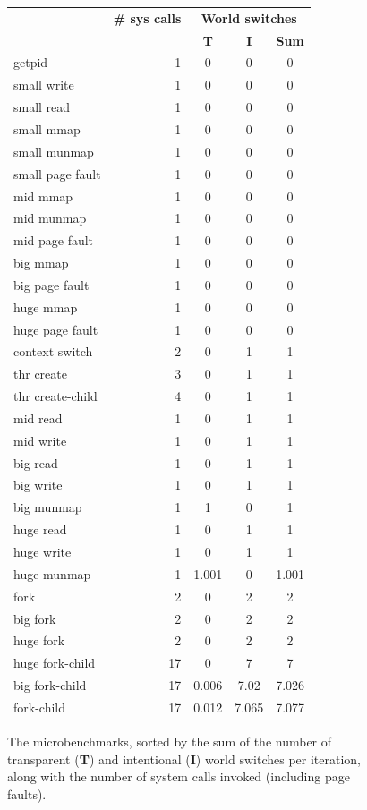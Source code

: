 \begin{figure}
\small
\centering
\begin{tabular}{lrccc}
  & {\bf \# sys calls} & \multicolumn{3}{c}{{\bf World switches}} \\
  & & {\bf T} & {\bf I} & {\bf Sum}  \\
  \midrule
getpid & 1 & 0 & 0 & 0 \\
small write & 1 & 0 & 0 & 0 \\
small read & 1 & 0 & 0 & 0 \\
small mmap & 1 & 0 & 0 & 0 \\
small munmap & 1 & 0 & 0 & 0 \\
small page fault & 1 & 0 & 0 & 0 \\
mid mmap & 1 & 0 & 0 & 0 \\
mid munmap & 1 & 0 & 0 & 0 \\
mid page fault & 1 & 0 & 0 & 0 \\
big mmap & 1 & 0 & 0 & 0 \\
big page fault & 1 & 0 & 0 & 0 \\
huge mmap & 1 & 0 & 0 & 0 \\
huge page fault & 1 & 0 & 0 & 0 \\
context switch & 2 & 0 & 1 & 1 \\
thr create & 3 & 0 & 1 & 1 \\
thr create-child & 4 & 0 & 1 & 1 \\
mid read & 1 & 0 & 1 & 1 \\
mid write & 1 & 0 & 1 & 1 \\
big read & 1 & 0 & 1 & 1 \\
big write & 1 & 0 & 1 & 1 \\
big munmap & 1 & 1 & 0 & 1 \\
huge read & 1 & 0 & 1 & 1 \\
huge write & 1 & 0 & 1 & 1 \\
huge munmap & 1 & 1.001 & 0 & 1.001 \\
fork & 2 & 0 & 2 & 2 \\
big fork & 2 & 0 & 2 & 2 \\
huge fork & 2 & 0 & 2 & 2 \\
huge fork-child & 17 & 0 & 7 & 7 \\
big fork-child & 17 & 0.006 & 7.02 & 7.026 \\
fork-child & 17 & 0.012 & 7.065 & 7.077 \\
\end{tabular}
\caption{The microbenchmarks, sorted by the sum of the number of transparent
  ({\bf T}) and intentional ({\bf I}) world switches per iteration, along
  with the number of system calls invoked (including page faults).}
\label{fig:count}
\end{figure}

